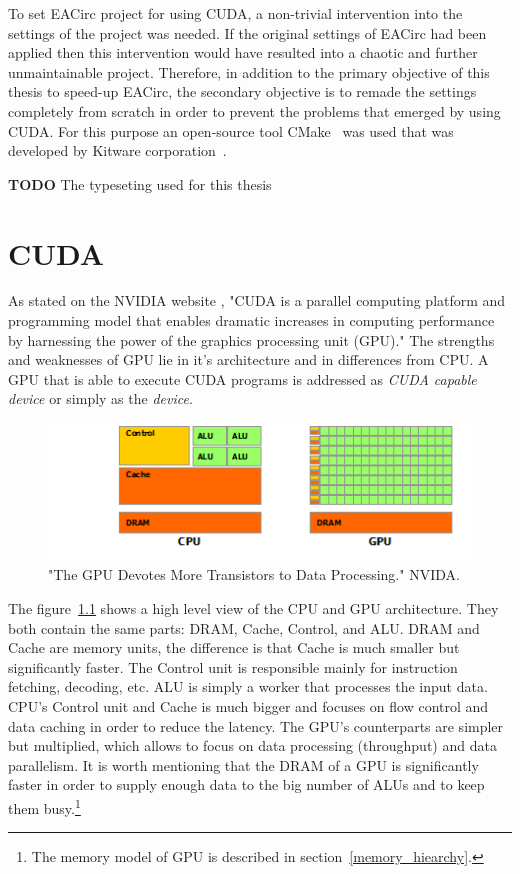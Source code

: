 \documentclass[12pt,oneside]{fithesis2}
\newcommand{\todo}{
	\noindent
	{\large\color{red}\textbf{TODO}}
}
\begin{document}
\bigskip

To set EACirc project for using CUDA, a non-trivial intervention into the settings of the project was needed. If the original settings of EACirc had been applied then this intervention would have resulted into a chaotic and further unmaintainable project. Therefore, in addition to the primary objective of this thesis to speed-up EACirc, the secondary objective is to remade the settings completely from scratch in order to prevent the problems that emerged by using CUDA. For this purpose an open-source tool CMake~\cite{cmake} was used that was developed by Kitware corporation~\cite{kitware}.

\bigskip

\todo{The typeseting used for this thesis}





\chapter{CUDA}
As stated on the NVIDIA website \cite{about_cuda}, "CUDA is a parallel computing platform and programming model that enables dramatic increases in computing performance by harnessing the power of the graphics processing unit (GPU)." The strengths and weaknesses of GPU lie in it's architecture and in differences from CPU. A GPU that is able to execute CUDA programs is addressed as \emph{CUDA capable device} or simply as the \emph{device}.

\begin{figure}[H]
	\centering
	\includegraphics{figures/gpu-devotes-more-transistors-to-data-processing.png}
	\caption{"The GPU Devotes More Transistors to Data Processing." NVIDA. \cite{cuda_guide}}
	\label{fig:cpu_vs_gpu_arch}
\end{figure}

The figure~\ref{fig:cpu_vs_gpu_arch} shows a high level view of the CPU and GPU architecture. They both contain the same parts: DRAM, Cache, Control, and ALU. DRAM and Cache are memory units, the difference is that Cache is much smaller but significantly faster. The Control unit is responsible mainly for instruction fetching, decoding, etc. ALU is simply a worker that processes the input data. CPU's Control unit and Cache is much bigger and focuses on flow control and data caching in order to reduce the latency. The GPU's counterparts are simpler but multiplied, which allows to focus on data processing (throughput) and data parallelism. It is worth mentioning that the DRAM of a GPU is significantly faster in order to supply enough data to the big number of ALUs and to keep them busy.\footnote{The memory model of GPU is described in section~\ref{memory_hiearchy}.}
\end{document}
